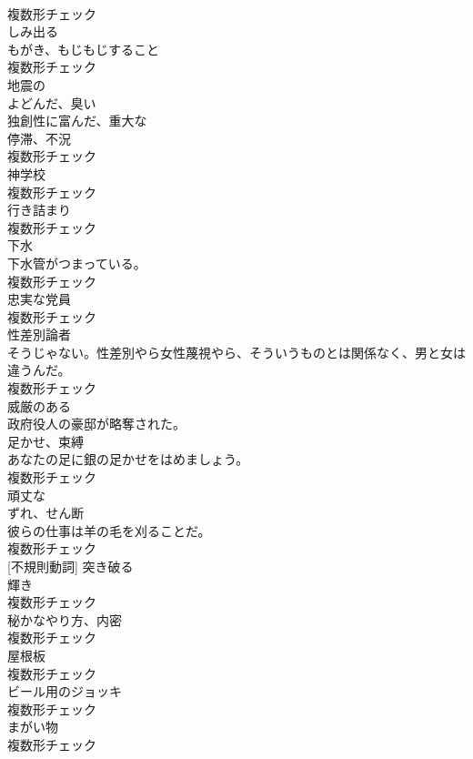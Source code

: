 \documentclass[8pt]{extreport}
\begin{document}
\begin{CJK}{UTF8}{min}
\\	複数形チェック
\\	[動詞]	しみ出る	
\\	[名詞]	もがき、もじもじすること	
\\	複数形チェック
\\	[形容詞]	地震の	
\\	[形容詞]	よどんだ、臭い	
\\	[形容詞]	独創性に富んだ、重大な	
\\	[名詞]	停滞、不況	
\\	複数形チェック
\\	[名詞]	神学校	
\\	複数形チェック
\\	[名詞]	行き詰まり	
\\	複数形チェック
\\	[名詞]	下水	
\\	下水管がつまっている。	
\\	複数形チェック
\\	[名詞]	忠実な党員	
\\	複数形チェック
\\	[名詞]	性差別論者	
\\	そうじゃない。性差別やら女性蔑視やら、そういうものとは関係なく、男と女は違うんだ。	
\\	複数形チェック
\\	[形容詞]	威厳のある	
\\	政府役人の豪邸が略奪された。	
\\	[名詞]	足かせ、束縛	
\\	あなたの足に銀の足かせをはめましょう。	
\\	複数形チェック
\\	[形容詞]	頑丈な	
\\	[名詞]	ずれ、せん断	
\\	彼らの仕事は羊の毛を刈ることだ。	
\\	複数形チェック
\\	[動詞] [不規則動詞]	突き破る	
\\	[名詞]	輝き	
\\	複数形チェック
\\	[名詞]	秘かなやり方、内密	
\\	複数形チェック
\\	[名詞]	屋根板	
\\	複数形チェック
\\	[名詞]	ビール用のジョッキ	
\\	複数形チェック
\\	[名詞]	まがい物	
\\	複数形チェック

\end{CJK}
\end{document}
